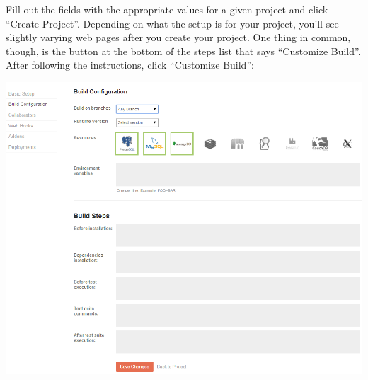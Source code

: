 \documentclass[12pt]{ucthesis}
\newenvironment{Figure}
  {\par\medskip\noindent\minipage{\linewidth}}
  {\endminipage\par\medskip}
\begin{document}
Fill out the fields with the appropriate values for a given project and click ``Create Project''. Depending on what the setup is for your project, you'll see slightly varying web pages after you create your project. One thing in common, though, is the button at the bottom of the steps list that says ``Customize Build''. After following the instructions, click ``Customize Build'':
\begin{Figure}
  \centering
  \includegraphics[width=0.75\linewidth]{magnumCI_customize_build.png}
\end{Figure}
\end{document}
